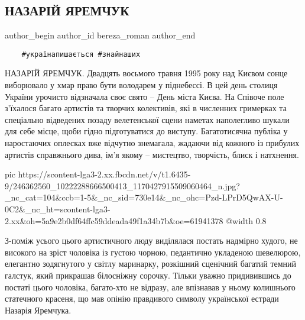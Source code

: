  
 
 
 
 
 
\subsection{НАЗАРІЙ ЯРЕМЧУК}
\label{sec:19_10_2021.fb.bereza_roman.1.nazarij_jaremchuk}
 
\ifcmt
 author_begin
   author_id bereza_roman
 author_end
\fi

\begin{verbatim}
	#українапишається #знайнаших 
\end{verbatim}

НАЗАРІЙ ЯРЕМЧУК. Двадцять восьмого травня 1995 року над Києвом сонце виборювало
у хмар право бути володарем у піднебессі. В цей день столиця України урочисто
відзначала своє свято – День міста Києва. На Співоче поле з’їхалося багато
артистів та творчих колективів, які в численних гримерках  та спеціально
відведених позаду велетенської сцени наметах наполегливо шукали для себе місце,
щоби гідно підготуватися до виступу. Багатотисячна публіка у наростаючих
оплесках вже відчутно знемагала, жадаючи від кожного із прибулих артистів
справжнього дива, ім’я якому – мистецтво, творчість, блиск і натхнення. 

\ifcmt
  pic https://scontent-lga3-2.xx.fbcdn.net/v/t1.6435-9/246362560_10222288666500413_1170427915509060464_n.jpg?_nc_cat=104&ccb=1-5&_nc_sid=730e14&_nc_ohc=Pzd-LPrD5QwAX-U-0C2&_nc_ht=scontent-lga3-2.xx&oh=5a9e2b0df64ffc59ddeada49f1a34b7b&oe=61941378
  @width 0.8
\fi

З-поміж усього цього артистичного люду виділялася постать надмірно худого, не
високого на зріст чоловіка із густою чорною, педантично укладеною шевелюрою,
елегантно зодягнутого у світлу маринарку, розкішний сценічний багатий темний
галстук, який прикрашав білосніжну сорочку. Тільки уважно придивившись до
постаті цього чоловіка, багато-хто не відразу, але впізнавав у ньому колишнього
статечного красеня, що мав опінію правдивого символу української естради
Назарія Яремчука.

